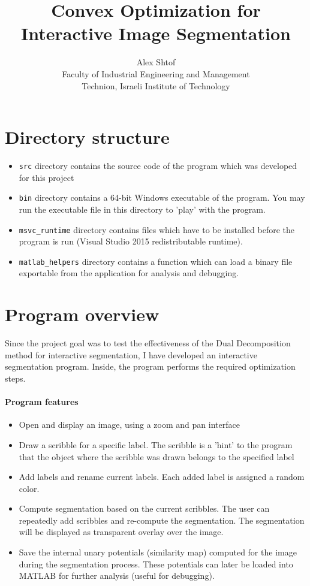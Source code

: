 \documentclass[12pt,a4paper]{article}
\title{Convex Optimization for Interactive Image Segmentation}
\author{Alex Shtof \\
        Faculty of Industrial Engineering and Management \\
        Technion, Israeli Institute of Technology}
\begin{document}
\maketitle

\section{Directory structure}
\begin{itemize}
	\item \texttt{src} directory contains the source code of the program which was developed for this project
	\item \texttt{bin} directory contains a 64-bit Windows executable of the program. You may run the executable file in this directory to 'play' with the program.
	\item \texttt{msvc\_runtime} directory contains files which have to be installed before the program is run (Visual Studio 2015 redistributable runtime). 
	\item \texttt{matlab\_helpers} directory contains a function which can load a binary file exportable from the application for analysis and debugging.
\end{itemize}


\section{Program overview}
Since the project goal was to test the effectiveness of the Dual Decomposition method for interactive segmentation, I have developed an interactive segmentation program. Inside, the program performs the required optimization steps. 

\paragraph{Program features}
\begin{itemize}
	\item Open and display an image, using a zoom and pan interface
	\item Draw a scribble for a specific label. The scribble is a 'hint' to the program that the object where the scribble was drawn belongs to the specified label
	\item Add labels and rename current labels. Each added label is assigned a random color.
	\item Compute segmentation based on the current scribbles. The user can repeatedly add scribbles and re-compute the segmentation. The segmentation will be displayed as transparent overlay over the image.
	\item Save the internal unary potentials (similarity map) computed for the image during the segmentation process. These potentials can later be loaded into MATLAB for further analysis (useful for debugging).
\end{itemize}
\end{document}
